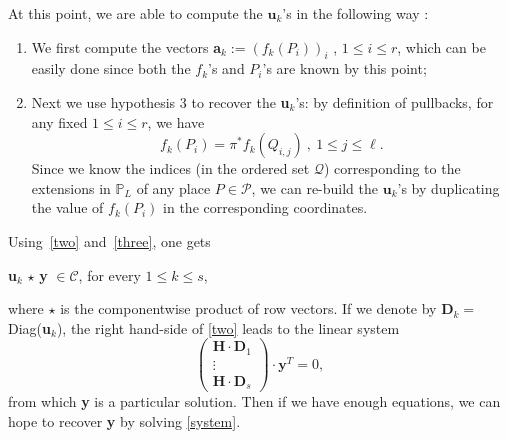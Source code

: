 \documentclass[10pt]{article}
\theoremstyle{definition}
\theoremstyle{definition}
\theoremstyle{definition}
\newcommand{\cd}{\cdot}
\newcommand{\PP}{\mathbb{P}}
\newcommand{\PR}{\mathcal{P}}
\newcommand{\QR}{\mathcal{Q}}
\begin{document}
At this point, we are able to compute the $\mathbf{u}_{k}$'s in the following way :
\begin{enumerate}
\item We first compute the vectors \textbf{a}$_{k} := (f_k(P_i))_i$ , $1 \leq i \leq r$, which can be easily done since both the $f_k$'s and $P_i$'s are known by this point;
\item Next we use hypothesis $3$ to recover the \textbf{u}$_{k}$'s: by definition of pullbacks, for any fixed $1 \leq i \leq r$, we have 
\[f_k(P_i) = \pi^*f_k(Q_{i,j}) \ , \ 1 \leq j \leq \ell.\]
Since we know the indices (in the ordered set $\QR$) corresponding to the extensions in $\PP_L$ of any place $P \in \PR$, we can re-build the $\mathbf{u}_{k}$'s by duplicating the value of $f_k(P_i)$ in the corresponding coordinates.
\end{enumerate}

Using~\eqref{two} and~\eqref{three}, one gets 
\begin{center}
\textbf{u}$_{k}$ $\star$ \textbf{y} $\in \mathcal{C}$, for every $1 \leq k \leq s,$ 
\end{center}
where $\star$ is the componentwise product of row vectors.
If we denote by \textbf{D}$_{k} = $ Diag(\textbf{u}$_{k}$), the right hand-side of \eqref{two} leads to the linear system 
\begin{equation} \label{system}
\begin{pmatrix}
\mathbf{H} \cd \textbf{D}_1 \\
\vdots \\
\mathbf{H} \cd \textbf{D}_s
\end{pmatrix}
\cd \textbf{y}^T = 0, 
\end{equation}
from which \textbf{y} is a particular solution.
Then if we have enough equations, we can hope to recover \textbf{y} by solving \eqref{system}. 
\end{document}
